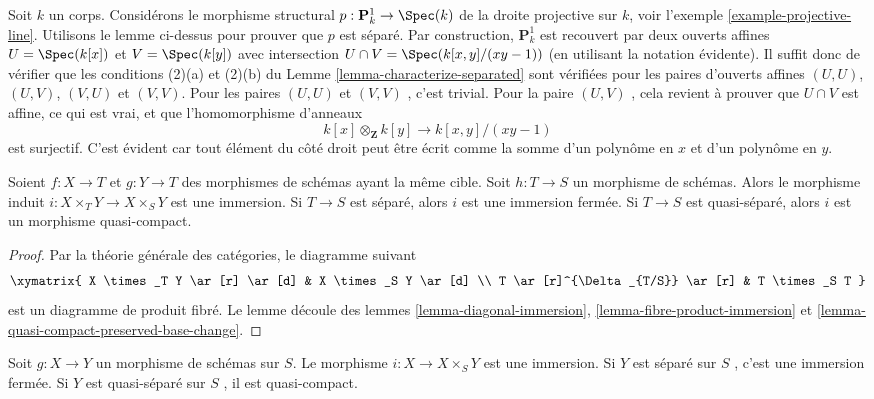 \begin{example}
\label{example-projective-line-separated}
Soit  $k$  un corps. Considérons le morphisme structural  $p : \mathbf{P}^1_k \to \Spec(k)$  de
la droite projective sur  $k$, voir l'exemple  \ref{example-projective-line}. Utilisons le
lemme ci-dessus pour prouver que  $p$  est séparé. Par construction,
 $\mathbf{P}^1_k$  est recouvert par deux ouverts affines  $U = \Spec(k[x])$  et  $V = \Spec(k[y])$ 
avec intersection  $U \cap V = \Spec(k[x, y]/(xy - 1))$  (en utilisant la notation évidente). Il suffit donc
de vérifier que les conditions (2)(a) et (2)(b) du Lemme  \ref{lemma-characterize-separated}  sont
vérifiées pour les paires d'ouverts affines  $(U, U)$,  $(U, V)$,
 $(V, U)$  et  $(V, V)$. Pour les paires  $(U, U)$  et  $(V, V)$ , c'est
trivial. Pour la paire  $(U, V)$ , cela revient à prouver que  $U \cap V$  est
affine, ce qui est vrai, et que l'homomorphisme d'anneaux
$$
k[x] \otimes_{\mathbf{Z}} k[y] \longrightarrow k[x, y]/(xy - 1)
$$
est surjectif. C'est évident car tout élément du côté droit peut être écrit comme
la somme d'un polynôme en  $x$  et d'un polynôme en  $y$.
\end{example}

\begin{lemma}
\label{lemma-fibre-product-after-map}
Soient  $f : X \to T$  et  $g : Y \to T$  des morphismes de schémas ayant la même cible.
Soit  $h : T \to S$  un morphisme de schémas. Alors le morphisme induit  $i : X \times_T Y \to X \times_S Y$ 
est une immersion. Si  $T \to S$  est séparé, alors  $i$  est une
immersion fermée. Si  $T \to S$  est quasi-séparé, alors  $i$  est un
morphisme quasi-compact.
\end{lemma}

\begin{proof}
Par la théorie générale des catégories, le diagramme suivant
$$
\xymatrix{
X \times_T Y \ar[r] \ar[d] & X \times_S Y \ar[d] \\
T \ar[r]^{\Delta_{T/S}} \ar[r] & T \times_S T
}
$$
est un diagramme de produit fibré. Le lemme découle des lemmes  \ref{lemma-diagonal-immersion},
 \ref{lemma-fibre-product-immersion}  et  \ref{lemma-quasi-compact-preserved-base-change}.
\end{proof}

\begin{lemma}
\label{lemma-semi-diagonal}
Soit  $g : X \to Y$  un morphisme de schémas sur  $S$. Le morphisme
 $i : X \to X \times_S Y$  est une immersion. Si  $Y$  est séparé sur  $S$ , c'est
une immersion fermée. Si  $Y$  est quasi-séparé sur  $S$ , il est
quasi-compact.
\end{lemma}


